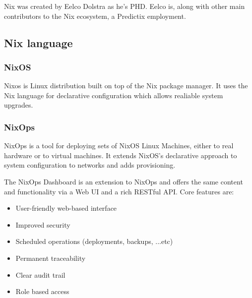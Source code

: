 Nix was created by Eelco Dolstra as he's PHD. Eelco is, along with other main
contributors to the Nix ecosystem, a Predictix employment.
\subsection{Nix language}


\subsubsection{NixOS}
Nixos is Linux distribution built on top of the Nix package manager. It
uses the Nix language for declarative configuration which allows realiable
system upgrades.

\subsubsection{NixOps}
NixOps is a tool for deploying sets of NixOS Linux Machines, either to real
hardware or to virtual machines. It extends NixOS's declarative approach to
system configuration to networks and adds provisioning.

\par
The NixOps Dashboard is an extension to NixOps and offers the same content and
functionality via a Web UI and a rich RESTful API. Core features are:

\begin{itemize}
\item User-friendly web-based interface
\item Improved security
\item Scheduled operations (deployments, backups, ...etc)
\item Permanent traceability
\item Clear audit trail
\item Role based access
\end{itemize}

